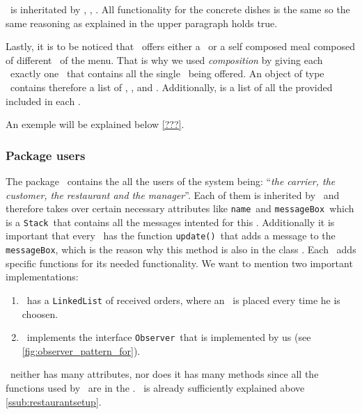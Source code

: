 \Dish~is inheritated by \Starter, \MainDish, \Dessert. All functionality for the concrete dishes is the same so the same reasoning as explained in the upper paragraph holds true. 

Lastly, it is to be noticed that \Restaurant~offers either a \Meal~or a self composed meal composed of different \Dish~of the menu. 
That is why we used \emph{composition} by giving each \Restaurant~exactly one \Menu~that contains all the single \Dish~being offered.
An object of type \Menu~contains therefore a list of \Starter, \MainDish, and \Dessert. Additionally, is a list of all the provided \Meal included in each \Restaurant.

An exemple will be explained below \ref{???}.


\subsubsection{Package users} %
\label{ssub:users}

The package \users~contains the all the users of the system being: ``\textit{the carrier, the customer, the restaurant and the manager}''.
Each of them is inherited by \User~and therefore takes over certain necessary attributes like \lstinline|name|~and \lstinline|messageBox|~which is a \lstinline|Stack|~that contains all the messages intented for this \User. Additionally it is important that every \User~has the function \lstinline|update()|~that adds a message to the \lstinline|messageBox|, which is the reason why this method is also in the class \User. Each \User~adds specific functions for its needed functionality. We want to mention two important implementations:

\begin{enumerate}
	\item \Courier~has a \lstinline|LinkedList| of received orders, where an \Order~is placed every time he is choosen.
	\item \Customer~implements the interface \lstinline|Observer|~that is implemented by us (see  \ref{fig:observer_pattern_for}).
\end{enumerate}

\Manager~neither has many attributes, nor does it has many methods since all the functions used by \Manager~are in the \Core.
\Restaurant~is already sufficiently explained above \ref{ssub:restaurantsetup}.


